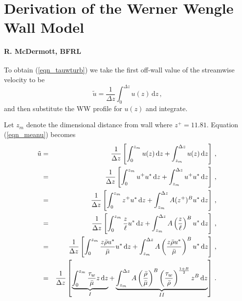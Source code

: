 \documentclass[11pt]{book}
\begin{document}
\chapter{Derivation of the Werner Wengle Wall Model}
\subsubsection{R. McDermott, BFRL}
\label{app_WWderivation}

To obtain (\ref{eqn_tauwturb}) we take the first off-wall value of the streamwise velocity to be
\begin{equation}
\label{eqn_meanu}
\tilde{u} = \frac{1}{\Delta z} \int_0^{\Delta z} u(z) \,\mbox{d}z \,\mbox{,}
\end{equation}
and then substitute the WW profile for $u(z)$ and integrate.

Let $z_m$ denote the dimensional distance from wall where $z^+ = 11.81$.  Equation (\ref{eqn_meanu}) becomes
\begin{eqnarray}
\label{eqn_uint}
\tilde{u} &=& \frac{1}{\Delta z} \left[ \int_0^{z_m} u(z) \,\mbox{d}z + \int_{z_m}^{\Delta z} u(z) \,\mbox{d}z \right] \,\mbox{,} \nonumber\vspace{0.2cm}\\
&=& \frac{1}{\Delta z} \left[ \int_0^{z_m} u^+ u^* \,\mbox{d}z + \int_{z_m}^{\Delta z} u^+ u^* \,\mbox{d}z \right] \,\mbox{,} \nonumber\vspace{0.2cm}\\
&=& \frac{1}{\Delta z} \left[ \int_0^{z_m} z^+ u^* \,\mbox{d}z + \int_{z_m}^{\Delta z} A(z^+)^B u^* \,\mbox{d}z \right] \,\mbox{,} \nonumber\vspace{0.2cm}\\
&=& \frac{1}{\Delta z} \left[ \int_0^{z_m} \frac{z}{\ell} u^* \,\mbox{d}z + \int_{z_m}^{\Delta z} A\left(\frac{z}{\ell}\right)^B u^* \,\mbox{d}z \right] \,\mbox{,} \nonumber\vspace{0.2cm}\\
&=& \frac{1}{\Delta z} \left[ \int_0^{z_m} \frac{z\bar{\rho}u^*}{\bar{\mu}} u^* \,\mbox{d}z + \int_{z_m}^{\Delta z} A\left(\frac{z\bar{\rho}u^*}{\bar{\mu}}\right)^B u^* \,\mbox{d}z \right] \,\mbox{,} \nonumber\vspace{0.2cm}\\
&=& \frac{1}{\Delta z} \left[ \underbrace{\int_0^{z_m} \frac{\tau_w}{\bar{\mu}} z\,\mbox{d}z}_{I} + \underbrace{\int_{z_m}^{\Delta z} A\left(\frac{\bar{\rho}}{\bar{\mu}}\right)^B \left(\frac{\tau_w}{\bar{\rho}}\right)^{\frac{1+B}{2}} z^B\,\mbox{d}z}_{II} \right] \,\mbox{.}
\end{eqnarray}
\end{document}
